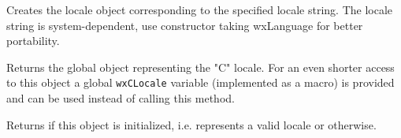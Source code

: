 
Creates the locale object corresponding to the specified locale string. The
locale string is system-dependent, use constructor taking wxLanguage for better
portability.


\label{wxxlocalegetclocale}


Returns the global object representing the "C" locale. For an even shorter
access to this object a global \texttt{wxCLocale} variable (implemented as a
macro) is provided and can be used instead of calling this method.


\label{wxxlocaleisok}


Returns \true if this object is initialized, i.e. represents a valid locale or 
\false otherwise.

